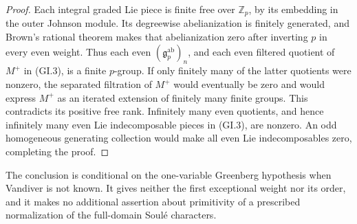 \begin{proof}
Each integral graded Lie piece is finite free over $\mathbb Z_p$,
by its embedding in the outer Johnson module.  Its degreewise
abelianization is finitely generated, and Brown's rational theorem
makes that abelianization zero after inverting $p$ in every even
weight.  Thus each even $(\mathfrak g_p^{\mathrm{ab}})_n$, and
each even filtered quotient of $M^+$ in (GI.3), is a finite
$p$-group.  If only finitely many of the latter quotients were
nonzero, the separated filtration of $M^+$ would eventually
be zero and would express $M^+$ as an iterated extension of
finitely many finite groups.  This contradicts its positive
free rank.  Infinitely many even quotients, and hence infinitely
many even Lie indecomposable pieces in (GI.3), are nonzero.
An odd homogeneous generating collection would make all even
Lie indecomposables zero, completing the proof.
\end{proof}

The conclusion is conditional on the one-variable Greenberg hypothesis
when Vandiver is not known.  It gives neither the first exceptional
weight nor its order, and it makes no additional assertion about
primitivity of a prescribed normalization of the full-domain
Soul\'e characters.
